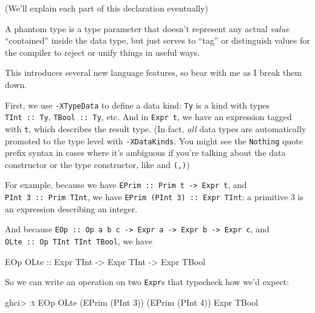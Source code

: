 \documentclass[]{article}
\newenvironment{Shaded}{}{}
\newcommand{\DataTypeTok}[1]{\textcolor[rgb]{0.56,0.13,0.00}{#1}}
\newcommand{\DecValTok}[1]{\textcolor[rgb]{0.25,0.63,0.44}{#1}}
\newcommand{\NormalTok}[1]{#1}
\newcommand{\OperatorTok}[1]{\textcolor[rgb]{0.40,0.40,0.40}{#1}}
\newcommand{\OtherTok}[1]{\textcolor[rgb]{0.00,0.44,0.13}{#1}}
\begin{document}
(We'll explain each part of this declaration eventually)

A phantom type is a type parameter that doesn't represent any actual
\emph{value} ``contained'' inside the data type, but just serves to ``tag'' or
distinguish values for the compiler to reject or unify things in useful ways.

This introduces several new language features, so bear with me as I break them
down.

First, we use \texttt{-XTypeData} to define a data kind: \texttt{Ty} is a kind
with types \texttt{TInt\ ::\ Ty}, \texttt{TBool\ ::\ Ty}, etc. And in
\texttt{Expr\ t}, we have an expression tagged with \texttt{t}, which describes
the result type. (In fact, \emph{all} data types are automatically promoted to
the type level with \texttt{-XDataKinds}. You might see the
\texttt{\textquotesingle{}Nothing} quote prefix syntax in cases where it's
ambiguous if you're talking about the data constructor or the type constructor,
like \texttt{\textquotesingle{}{[}{]}} and \texttt{\textquotesingle{}(,)})

For example, because we have
\texttt{EPrim\ ::\ Prim\ t\ -\textgreater{}\ Expr\ t}, and
\texttt{PInt\ 3\ ::\ Prim\ TInt}, we have
\texttt{EPrim\ (PInt\ 3)\ ::\ Expr\ TInt}: a primitive 3 is an expression
describing an integer.

And because
\texttt{EOp\ ::\ Op\ a\ b\ c\ -\textgreater{}\ Expr\ a\ -\textgreater{}\ Expr\ b\ -\textgreater{}\ Expr\ c},
and \texttt{OLte\ ::\ Op\ TInt\ TInt\ TBool}, we have

\begin{Shaded}
\begin{Highlighting}[]
\DataTypeTok{EOp} \DataTypeTok{OLte}\OtherTok{ ::} \DataTypeTok{Expr} \DataTypeTok{TInt} \OtherTok{{-}\textgreater{}} \DataTypeTok{Expr} \DataTypeTok{TInt} \OtherTok{{-}\textgreater{}} \DataTypeTok{Expr} \DataTypeTok{TBool}
\end{Highlighting}
\end{Shaded}

So we can write an operation on two \texttt{Expr}s that typecheck how we'd
expect:

\begin{Shaded}
\begin{Highlighting}[]
\NormalTok{ghci}\OperatorTok{\textgreater{}} \OperatorTok{:}\NormalTok{t }\DataTypeTok{EOp} \DataTypeTok{OLte}\NormalTok{ (}\DataTypeTok{EPrim}\NormalTok{ (}\DataTypeTok{PInt} \DecValTok{3}\NormalTok{)) (}\DataTypeTok{EPrim}\NormalTok{ (}\DataTypeTok{PInt} \DecValTok{4}\NormalTok{))}
\DataTypeTok{Expr} \DataTypeTok{TBool}
\end{Highlighting}
\end{Shaded}
\end{document}
